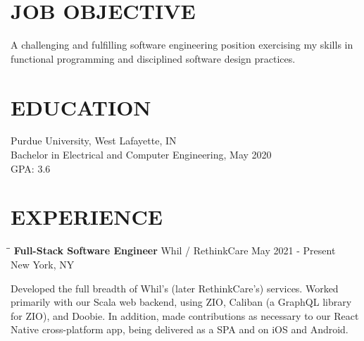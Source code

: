 \documentclass[10pt]{res}
\begin{document}
 
\vspace{-30pt}

\address{\bf ADDRESS\\ 17307 Striped Maple Street \\ Westfield, IN, 46074} 
\address{\bf CONTACT\\ (317) 363-7700 \\ joseph@gerardot.org/indyjag@gmail.com } 
                                  
\begin{resume}

\vspace{-10pt}\section{JOB OBJECTIVE}          
      A challenging and fulfilling software engineering position exercising my skills
      in functional programming and disciplined software design practices.
\vspace{-10pt}\section{EDUCATION}          
    Purdue University, West Lafayette, IN \\ 
    Bachelor in Electrical and Computer Engineering, May 2020   \\       
	GPA: 3.6 \\
 
\vspace{-20pt}\section{EXPERIENCE}
   \vspace{-0.1in}	
	\begin{tabbing}
   \hspace{2.3in}\= \hspace{2.6in}\= \kill %
    {\bf Full-Stack Software Engineer} \>Whil / RethinkCare \>May 2021 - Present \\
                             \>New York, NY
   \end{tabbing}\vspace{-20pt}      %
	Developed the full breadth of Whil's (later RethinkCare's) services. Worked primarily
	with our Scala web backend, using ZIO, Caliban (a GraphQL library for ZIO), and Doobie.
	In addition, made contributions as necessary to our React Native cross-platform app,
	being delivered as a SPA and on iOS and Android.


\end{resume}
\end{document}
